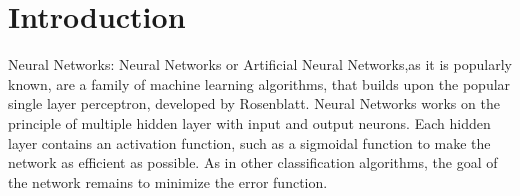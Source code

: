 \documentclass[conference]{IEEEtran}
\begin{document}




\maketitle

\begin{abstract}
The report  discusses the popular caffe framework to classify images using deep learning algorithms.The training model is based on the  popular imagenet example and the data from the ilsvrc 2012 challenge \cite{IEEEhowto:kopka}. The images used for classification were provided by the chair of pattern recognition affiliated to the faculty of computer science, TU M{\"u}nchen.The paper also discusses the popular back propogation algorithm. 
\end{abstract}





%
\IEEEpeerreviewmaketitle



\section{Introduction}


Neural Networks: Neural Networks or Artificial Neural Networks,as it is popularly known,  are a family of machine learning algorithms, that builds upon the popular single layer perceptron, developed by Rosenblatt. Neural Networks works on the principle of multiple hidden layer with input and output neurons. Each hidden layer contains an activation function, such as a sigmoidal function to make the network as efficient as possible. As in other classification algorithms, the goal of the network remains to minimize the error function.
\end{document}
